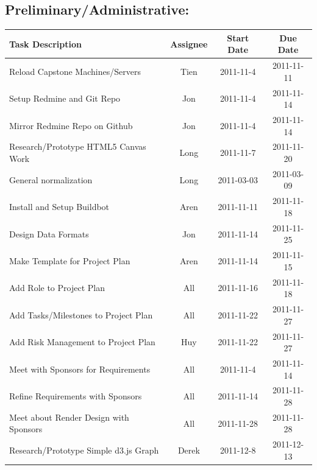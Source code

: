 \documentclass[12pt, letterpaper]{article}
\begin{document}
	\subsection{Preliminary/Administrative:}

  \begin{center}
    \begin{tabular}{| p{8.3cm} || c | c | c | }
      \hline
      Task Description & Assignee & Start Date & Due Date \\
      \hline
			Reload Capstone Machines/Servers & Tien & 2011-11-4 & 2011-11-11\\
			Setup Redmine and Git Repo & Jon & 2011-11-4 & 2011-11-14 \\
			Mirror Redmine Repo on Github & Jon & 2011-11-4 & 2011-11-14 \\
			Research/Prototype HTML5 Canvas Work & Long & 2011-11-7 & 2011-11-20 \\
			General normalization & Long & 2011-03-03 & 2011-03-09 \\
      Install and Setup Buildbot & Aren & 2011-11-11 & 2011-11-18 \\
            Design Data Formats & Jon & 2011-11-14 & 2011-11-25 \\
      Make Template for Project Plan & Aren & 2011-11-14 & 2011-11-15 \\
			Add Role to Project Plan & All & 2011-11-16 & 2011-11-18 \\
			Add Tasks/Milestones to Project Plan & All & 2011-11-22 & 2011-11-27\\
			Add Risk Management to Project Plan & Huy & 2011-11-22 & 2011-11-27\\
			Meet with Sponsors for Requirements & All & 2011-11-4 & 2011-11-14\\
			Refine Requirements with Sponsors & All & 2011-11-14 & 2011-11-28\\
			Meet about Render Design with Sponsors & All & 2011-11-28 & 2011-11-28 \\
            Research/Prototype Simple d3.js Graph & Derek & 2011-12-8 & 2011-12-13 \\
      \hline
    \end{tabular}
  \end{center}
\end{document}
